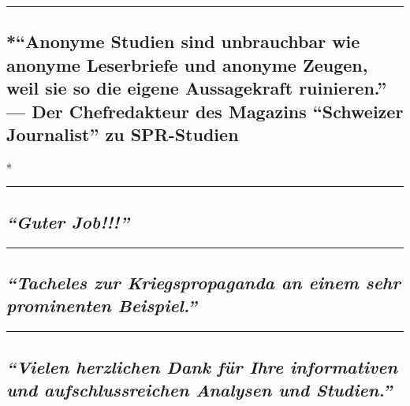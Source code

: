 \begin{center}\rule{0.5\linewidth}{\linethickness}\end{center}

\hypertarget{anonyme-studien-sind-unbrauchbar-wie-anonyme-leserbriefe-und-anonyme-zeugen-weil-sie-so-die-eigene-aussagekraft-ruinieren--der-chefredakteur-des-magazins-schweizer-journalist-zu-spr-studien}{%
\subsection{*``Anonyme Studien sind unbrauchbar wie anonyme Leserbriefe
und anonyme Zeugen, weil sie so die eigene Aussagekraft ruinieren.'' ---
Der Chefredakteur des Magazins ``Schweizer Journalist'' zu
SPR-Studien}\label{anonyme-studien-sind-unbrauchbar-wie-anonyme-leserbriefe-und-anonyme-zeugen-weil-sie-so-die-eigene-aussagekraft-ruinieren--der-chefredakteur-des-magazins-schweizer-journalist-zu-spr-studien}}

*

\begin{center}\rule{0.5\linewidth}{\linethickness}\end{center}

\hypertarget{guter-job}{%
\subsection{\texorpdfstring{\emph{``Guter
Job!!!''}}{``Guter Job!!!''}}\label{guter-job}}

\begin{center}\rule{0.5\linewidth}{\linethickness}\end{center}

\hypertarget{-tacheles-zur-kriegspropaganda-an-einem-sehr-prominenten-beispiel}{%
\subsection{\texorpdfstring{ \emph{``Tacheles zur Kriegspropaganda an
einem sehr prominenten
Beispiel.''}}{ ``Tacheles zur Kriegspropaganda an einem sehr prominenten Beispiel.''}}\label{-tacheles-zur-kriegspropaganda-an-einem-sehr-prominenten-beispiel}}

\begin{center}\rule{0.5\linewidth}{\linethickness}\end{center}

\hypertarget{-vielen-herzlichen-dank-fuxfcr-ihre-informativen-und-aufschlussreichen-analysen-und-studien}{%
\subsection{\texorpdfstring{ \emph{``Vielen herzlichen Dank für Ihre
informativen und aufschlussreichen Analysen und
Studien.''}}{ ``Vielen herzlichen Dank für Ihre informativen und aufschlussreichen Analysen und Studien.''}}\label{-vielen-herzlichen-dank-fuxfcr-ihre-informativen-und-aufschlussreichen-analysen-und-studien}}

